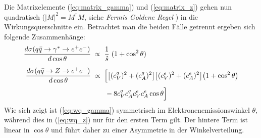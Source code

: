 Die Matrixelemente (\ref{eq:matrix_gamma}) und (\ref{eq:matrix_z}) gehen nun
quadratisch ($|M|^2=M^\dagger M$, siehe \textit{Fermis Goldene Regel}
\cite{Griffiths:2008zz}) in die Wirkungsquerschnitte ein. Betrachtet man die
beiden Fälle getrennt ergeben sich folgende Zusammenhänge:
\begin{align}
    \frac{d\sigma(q\bar q\rightarrow \gamma^* \rightarrow e^+e^-)}{d\cos\theta}
        &\;\propto\; \frac{1}{\hat s}\;(1+\cos^2\theta)
        \label{eq:wq_gamma} \\[5pt]
    \frac{d\sigma(q\bar q\rightarrow Z \rightarrow e^+e^-)}{d\cos\theta}
        &\;\propto\;
            \Bigl[
                \bigl[ (c_V^q)^2 + (c_A^q)^2 \bigr]
                \bigl[ (c_V^e)^2 + (c_A^e)^2 \bigr]
                \bigl( 1 + \cos^2\theta      \bigr)
                \nonumber \\[3pt] & \qquad
                - 8 c_V^q c_A^q c_V^e c_A^e \cos\theta
            \Bigr]
            \label{eq:wq_z}
\end{align}
Wie sich zeigt ist (\ref{eq:wq_gamma}) symmetrisch im Elektronenemissionswinkel
$\theta$, während dies in (\ref{eq:wq_z}) nur für den ersten Term gilt. Der
hintere Term ist linear in $\cos\theta$ und führt daher zu einer Asymmetrie in
der Winkelverteilung.

\pagebreak

